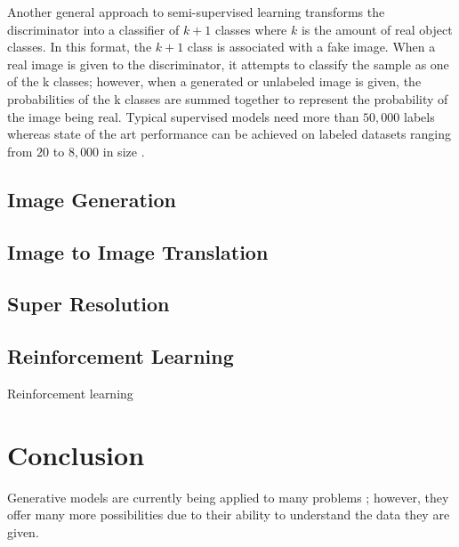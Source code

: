 \documentclass[11pt]{article}
\begin{document}
Another general approach to semi-supervised learning transforms the discriminator into a classifier of $k + 1$ classes where $k$ is the amount of real object classes. In this format, the $k + 1$ class is associated with a fake image. When a real image is given to the discriminator, it attempts to classify the sample as one of the k classes; however, when a generated or unlabeled image is given, the probabilities of the k classes are summed together to represent the probability of the image being real. Typical supervised models need more than $50,000$ labels whereas state of the art performance can be achieved on labeled datasets ranging from $20$ to $8,000$ in size \citep{2017arXiv170100160G}.

\subsection{Image Generation}
\subsection{Image to Image Translation} \label{sec:img2img}
\subsection{Super Resolution}
\subsection{Reinforcement Learning}
Reinforcement learning

\section{Conclusion}
Generative models are currently being applied to many problems \citep{genmodelingopenai}; however, they offer many more possibilities due to their ability to understand the data they are given.



\end{document}
